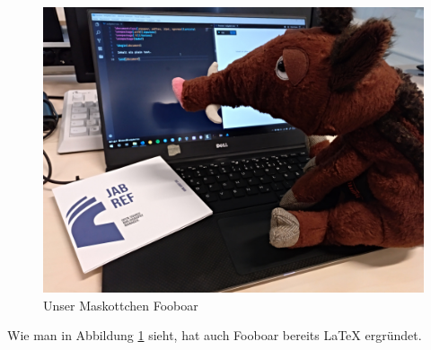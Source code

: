 \documentclass[a4paper, ngerman]{article}
\begin{document}
\thispagestyle{empty}
\begin{figure}[H]
  \includegraphics[width=\textwidth]{listings/referenzen/fooboar.jpeg}
  \caption{Unser Maskottchen Fooboar}
  \label{img:fooboar}
\end{figure}

Wie man in Abbildung \ref{img:fooboar} sieht, hat auch Fooboar bereits \LaTeX{} ergründet.
\end{document}
